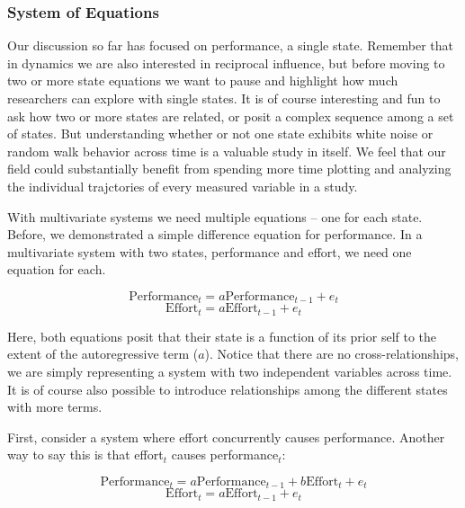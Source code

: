 \documentclass[english,,man]{apa6}
\theoremstyle{definition}
\theoremstyle{definition}
\theoremstyle{definition}
\theoremstyle{remark}
\begin{document}
\hypertarget{system-of-equations}{%
\subsubsection{System of Equations}\label{system-of-equations}}

Our discussion so far has focused on performance, a single state.
Remember that in dynamics we are also interested in reciprocal
influence, but before moving to two or more state equations we want to
pause and highlight how much researchers can explore with single states.
It is of course interesting and fun to ask how two or more states are
related, or posit a complex sequence among a set of states. But
understanding whether or not one state exhibits white noise or random
walk behavior across time is a valuable study in itself. We feel that
our field could substantially benefit from spending more time plotting
and analyzing the individual trajctories of every measured variable in a
study.

With multivariate systems we need multiple equations -- one for each
state. Before, we demonstrated a simple difference equation for
performance. In a multivariate system with two states, performance and
effort, we need one equation for each.

\begin{equation}
\label{sysy}
\textrm{Performance}_{t} = a \textrm{Performance}_{t - 1} + e_{t}
\end{equation} \begin{equation}
\label{sysx}
\textrm{Effort}_{t} = a \textrm{Effort}_{t - 1} + e_{t}
\end{equation}

\noindent Here, both equations posit that their state is a function of
its prior self to the extent of the autoregressive term (\(a\)). Notice
that there are no cross-relationships, we are simply representing a
system with two independent variables across time. It is of course also
possible to introduce relationships among the different states with more
terms.

First, consider a system where effort concurrently causes performance.
Another way to say this is that effort\(_t\) causes performance\(_t\):

\begin{equation}
\label{sysy2}
\textrm{Performance}_{t} = a \textrm{Performance}_{t - 1} + b \textrm{Effort}_{t} + e_{t}
\end{equation} \begin{equation}
\label{sysx2}
\textrm{Effort}_{t} = a \textrm{Effort}_{t - 1} + e_{t}
\end{equation}
\end{document}
